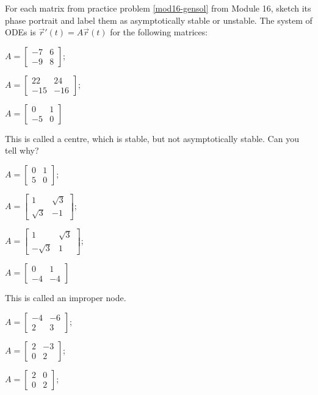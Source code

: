 \begin{exercises}

	\begin{problist}
	\prob For each matrix from practice problem \ref{mod16-gensol} from Module 16, sketch its phase portrait and label them as asymptotically stable or unstable. The system of ODEs is $\vec{r}'(t) = A \vec{r}(t)$ for the following matrices:
	\begin{enumerate}
	\begin{minipage}{.2\textwidth}
		\item $A = \begin{bmatrix} -7 & 6 \\ -9 & 8 \end{bmatrix}$;
		\item $A = \begin{bmatrix} 22 & 24 \\ -15 & -16\end{bmatrix}$;
		\item $A = \begin{bmatrix} 0 & 1 \\ -5 & 0 \end{bmatrix}$
		
		This is called a centre, which is stable, but not asymptotically stable. Can you tell why?
		\item $A = \begin{bmatrix} 0 & 1 \\ 5 & 0 \end{bmatrix}$;
		\item $A = \begin{bmatrix} 1 & \sqrt{3} \\ \sqrt{3} & -1\end{bmatrix}$;
		\item $A = \begin{bmatrix} 1 & \sqrt{3} \\ -\sqrt{3} & 1\end{bmatrix}$;
	\end{minipage}
	\qquad
	\begin{minipage}{.2\textwidth}
		\item $A = \begin{bmatrix} 0 & 1 \\ -4 & -4 \end{bmatrix}$
		
		This is called an improper node.
		\item $A = \begin{bmatrix} -4 & -6 \\ 2 & 3 \end{bmatrix}$;
		\item $A = \begin{bmatrix} 2 & -3 \\ 0 & 2 \end{bmatrix}$;
		\item $A = \begin{bmatrix} 2 & 0 \\ 0 & 2 \end{bmatrix}$;
		

\end{minipage}
\end{enumerate}
\end{problist}
\end{exercises}
